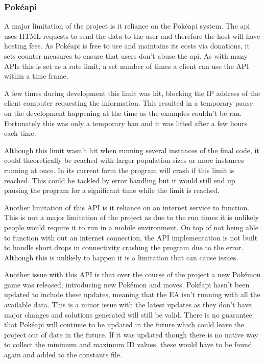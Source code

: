\documentclass[a4paper]{article}
\newcommand{\Pokemon}{Pok\'{e}mon}
\newcommand{\Pokeapi}{Pok\'{e}api}
\begin{document}
\subsubsection{\Pokeapi{}}
\par
A major limitation of the project is it reliance on the \Pokeapi{} system.
The api uses HTML requests to send the data to the user and therefore the host will have hosting fees.
As \Pokeapi{} is free to use and maintains its costs via donations, it sets counter measures to ensure that users don't abuse the api.
As with many APIs this is set as a rate limit, a set number of times a client can use the API within a time frame.
\par
A few times during development this limit was hit, blocking the IP address of the client computer requesting the information.
This resulted in a temporary pause on the development happening at the time as the examples couldn't be ran.
Fortunately this was only a temporary ban and it was lifted after a few hours each time.
\par
Although this limit wasn't hit when running several instances of the final code, it could theoretically be reached with larger population sizes or more instances running at once.
In its current form the program will crash if this limit is reached.
This could be tackled by error handling but it would still end up pausing the program for a significant time while the limit is reached.
\\ \par
Another limitation of this API is it reliance on an internet service to function.
This is not a major limitation of the project as due to the run times it is unlikely people would require it to run in a mobile environment.
On top of not being able to function with out an internet connection, the API implementation is not built to handle short drops in connectivity crashing the program due to the error.
Although this is unlikely to happen it is a limitation that can cause issues.
\\ \par
Another issue with this API is that over the course of the project a new \Pokemon{} game was released, introducing new \Pokemon{} and moves.
\Pokeapi{} hasn't been updated to include these updates, meaning that the EA isn't running with all the available data.
This is a minor issue with the latest updates as they don't have major changes and solutions generated will still be valid.
There is no guarantee that \Pokeapi{} will continue to be updated in the future which could leave the project out of date in the future.
If it was updated though there is no native way to collect the minimum and maximum ID values, these would have to be found again and added to the constants file.
\end{document}
